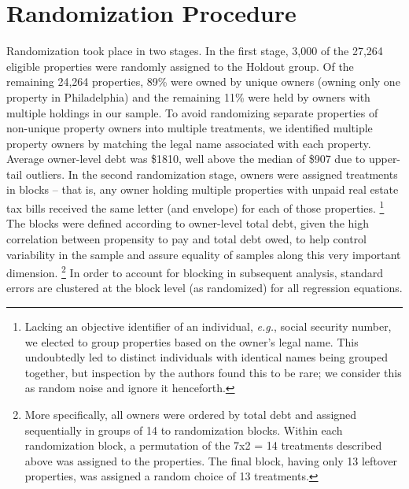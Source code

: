 \documentclass[12pt,titlepage]{article}
\begin{document}
\section{Randomization Procedure}


Randomization took place in two stages. In the first stage, 3,000 
of the 27,264 eligible properties were randomly assigned 
to the Holdout group. Of the remaining 24,264 properties, 89\% were 
owned by unique owners (owning only one property in Philadelphia) and 
the remaining 11\% were held by owners with multiple holdings in our sample. To avoid 
randomizing separate properties of non-unique property owners into 
multiple treatments, we identified multiple property owners by 
matching the legal name associated with each property. Average 
owner-level debt was \$1810, well above the median of \$907 due to 
upper-tail outliers. In the second randomization stage, owners were 
assigned treatments in blocks – that is, any owner holding multiple 
properties with unpaid real estate tax bills received the same letter 
(and envelope) for each of those properties.
\footnote{
	Lacking an objective identifier of an individual, \textit{e.g.}, social 
	security number, we elected to group properties based on 
	the owner's legal name. This undoubtedly led to distinct 
	individuals with identical names being grouped together, but 
	inspection by the authors found this to be rare; we consider this 
	as random noise and ignore it henceforth.
}
The blocks were defined according to owner-level total debt, given 
the high correlation between propensity to pay and total debt owed, 
to help control variability in the sample and assure equality of 
samples along this very important dimension.
\footnote{
	More specifically, all owners were ordered by total debt and assigned 
	sequentially in groups of 14 to randomization blocks. Within each 
	randomization block, a permutation of the 7x2 = 14 treatments described 
	above was assigned to the properties. The final block, having only 13 
	leftover properties, was assigned a random choice of 13 treatments.
}
In order to account for blocking in subsequent analysis, standard errors 
are clustered at the block level (as randomized) for all regression equations. 
\end{document}
